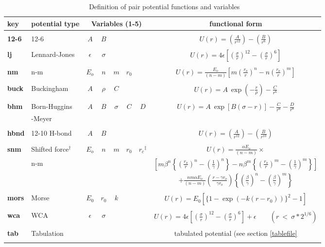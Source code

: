 \begin{table}[ht]
 \caption{\label{vdwtable}\ Definition of pair potential functions and
variables}
\vskip 10pt
 \begin{centering}
 \begin{tabular}{|l|l|c|c|c|c|c|c|}
\hline
key & potential type &
\multicolumn{5}{c|}{Variables (1-5)}& functional form\\
\hline
&&&&&&&\\
{\bf 12-6} & 12-6 & $A$ & $B$ &  &  & &$U(r)=\left(\frac{A}{r^{12}}\right)-
\left(\frac{B}{r^{6}}\right)$ \\
&&&&&&&\\
{\bf lj} & Lennard-Jones & $\epsilon$ & $\sigma$ &&&&$U(r) =
4\epsilon\left[\left(\frac{\sigma}{r}\right)^{12}-\left(\frac{\sigma}{r}\right)^{6}\right
]$\\
&&&&&&&\\
{\bf nm} & n-m & $E_{o}$ & $n$ & $m$ & $r_{0}$&&$U(r)=\frac{E_{o}}{(n-m)}\left[m\left
(\frac{r_{o}}{r}\right)^{n}-n\left(\frac{r_{o}}{r}\right)^{m}\right
]$\\
&&&&&&&\\
{\bf buck} & Buckingham & $A$ & $\rho$ & $C$ &&&$U(r)=A~\exp\left(-\frac{r}{\rho}\right)-\frac{C}{r^{6}}$\\
&&&&&&&\\
{\bf bhm} & Born-Huggins & $A$ & $B$ & $\sigma$ & $C$ & $D$ &$U(r)=A~\exp[B(\sigma-r)]-\frac{C}{r^{6}}-\frac{D}{r^{8}}$\\
& -Meyer &&&&&&\\
&&&&&&&\\
{\bf hbnd} & 12-10 H-bond & $A$ & $B$ &  &  & &$U(r)=\left(\frac{A}{r^{12}}\right)-
\left(\frac{B}{r^{10}}\right)$ \\
&&&&&&&\\
{\bf snm} & Shifted force$^{\dagger}$ & $E_{o}$ & $n$ & $m$ &
$r_{0}$ & $r_{c}$$^{\ddagger}$ &
$U(r)=\frac{\alpha E_{o}}{(n-m)}\times$\\
& n-m  \cite{clarke-86a} &
 & & & & &$\left [m\beta^{n}\left \{ \left (\frac{r_{o}}{r}\right )^{n}-
\left(\frac{1}{\gamma}\right)^{n}\right \}-n\beta^{m}\left \{ \left (
\frac{r_{o}}{r}\right )^{m}-\left(\frac{1}{\gamma}\right)^{m}\right \} 
\right ]$ \\
& & & & & & &$+\frac{nm\alpha E_{o}}{(n-m)} \left ( \frac{r-\gamma r_{o}}
{\gamma r_{o}}\right )\left\{\left(\frac{\beta}{\gamma}\right)^{n}
-\left(\frac{\beta}{\gamma}\right )^{m}\right \}$\\
&&&&&&&\\
{\bf mors} & Morse & $E_{0}$ & $r_{0}$ & $k$& & &$U(r)=E_{0}[\{1-\exp(-k(r-r_{0}))\}^{2}-1]$\\ 
&&&&&&&\\
{\bf wca} & WCA & $\epsilon$ & $\sigma$ &&&&$U(r) =
4\epsilon\left[\left(\frac{\sigma}{r}\right)^{12}-\left(\frac{\sigma}{r}\right)^{6}\right
]+\epsilon \qquad (r~<~\sigma*2^{1/6})$\\
&&&&&&&\\
{\bf tab} & Tabulation & & & & & & tabulated potential (see section \ref{tablefile} \\
&&&&&&&\\
\hline
\end{tabular}


\end{centering}
\end{table}
